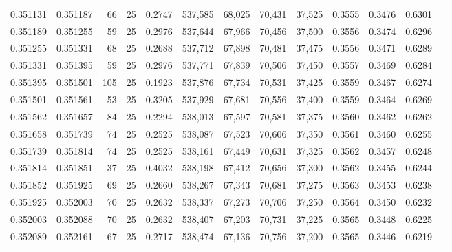 \begin{tabular}{rrrrrrrrrrrrr}
0.351131 & 0.351187 &    66 &  25 &                                     0.2747 & 537,585 &  68,025 &  70,431 &  37,525 & 0.3555 & 0.3476 & 0.6301 \\
0.351189 & 0.351255 &    59 &  25 &                                     0.2976 & 537,644 &  67,966 &  70,456 &  37,500 & 0.3556 & 0.3474 & 0.6296 \\
0.351255 & 0.351331 &    68 &  25 &                                     0.2688 & 537,712 &  67,898 &  70,481 &  37,475 & 0.3556 & 0.3471 & 0.6289 \\
0.351331 & 0.351395 &    59 &  25 &                                     0.2976 & 537,771 &  67,839 &  70,506 &  37,450 & 0.3557 & 0.3469 & 0.6284 \\
0.351395 & 0.351501 &   105 &  25 &                                     0.1923 & 537,876 &  67,734 &  70,531 &  37,425 & 0.3559 & 0.3467 & 0.6274 \\
0.351501 & 0.351561 &    53 &  25 &                                     0.3205 & 537,929 &  67,681 &  70,556 &  37,400 & 0.3559 & 0.3464 & 0.6269 \\
0.351562 & 0.351657 &    84 &  25 &                                     0.2294 & 538,013 &  67,597 &  70,581 &  37,375 & 0.3560 & 0.3462 & 0.6262 \\
0.351658 & 0.351739 &    74 &  25 &                                     0.2525 & 538,087 &  67,523 &  70,606 &  37,350 & 0.3561 & 0.3460 & 0.6255 \\
0.351739 & 0.351814 &    74 &  25 &                                     0.2525 & 538,161 &  67,449 &  70,631 &  37,325 & 0.3562 & 0.3457 & 0.6248 \\
0.351814 & 0.351851 &    37 &  25 &                                     0.4032 & 538,198 &  67,412 &  70,656 &  37,300 & 0.3562 & 0.3455 & 0.6244 \\
0.351852 & 0.351925 &    69 &  25 &                                     0.2660 & 538,267 &  67,343 &  70,681 &  37,275 & 0.3563 & 0.3453 & 0.6238 \\
0.351925 & 0.352003 &    70 &  25 &                                     0.2632 & 538,337 &  67,273 &  70,706 &  37,250 & 0.3564 & 0.3450 & 0.6232 \\
0.352003 & 0.352088 &    70 &  25 &                                     0.2632 & 538,407 &  67,203 &  70,731 &  37,225 & 0.3565 & 0.3448 & 0.6225 \\
0.352089 & 0.352161 &    67 &  25 &                                     0.2717 & 538,474 &  67,136 &  70,756 &  37,200 & 0.3565 & 0.3446 & 0.6219 \\

\end{tabular}
